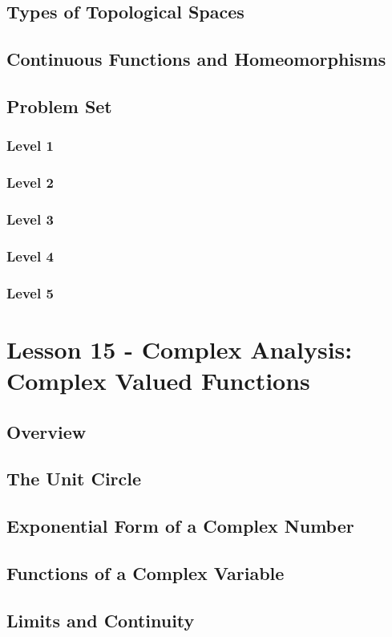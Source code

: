 \documentclass{article}
\begin{document}
\subsection{Types of Topological Spaces}
\subsection{Continuous Functions and Homeomorphisms}
\subsection{Problem Set}
\subsubsection{Level 1}
\subsubsection{Level 2}
\subsubsection{Level 3}
\subsubsection{Level 4}
\subsubsection{Level 5}
\pagebreak

\section{Lesson 15 - Complex Analysis: Complex Valued Functions}
\subsection{Overview}
\subsection{The Unit Circle}
\subsection{Exponential Form of a Complex Number}
\subsection{Functions of a Complex Variable}
\subsection{Limits and Continuity}
\end{document}
